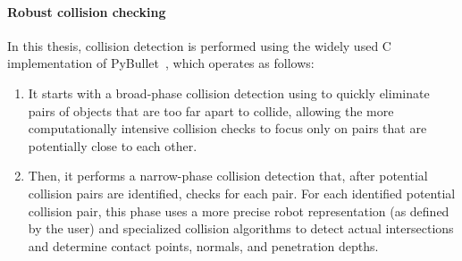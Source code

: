 \paragraph{Robust collision checking}
In this thesis, collision detection is performed using the widely used C implementation of PyBullet~\cite{cBullet}, which operates as follows: 
\begin{enumerate}
    \item It starts with a broad-phase collision detection using  to quickly eliminate pairs of objects that are too far apart to collide, allowing the more computationally intensive collision checks to focus only on pairs that are potentially close to each other.
    \item Then, it performs a narrow-phase collision detection that, after potential collision pairs are identified, checks for each pair. For each identified potential collision pair, this phase uses a more precise robot representation (as defined by the user) and specialized collision algorithms to detect actual intersections and determine contact points, normals, and penetration depths.
\end{enumerate}

